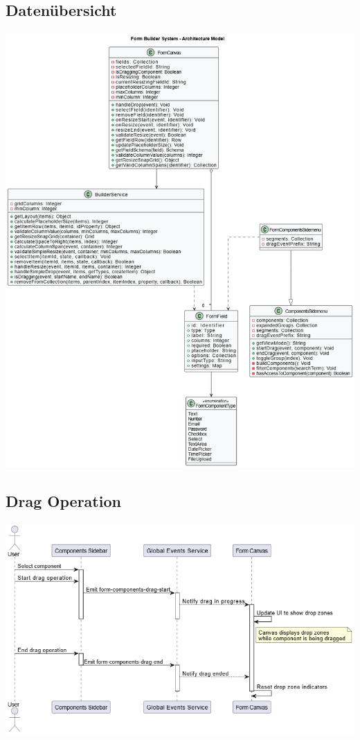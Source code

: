 \documentclass[a4paper,11pt]{article}
\begin{document}
\subsection{ Datenübersicht}
\includegraphics[width=1.1\textwidth]{UML Class digram.drawio}


\newpage
\subsection{ Drag Operation}
\includegraphics[width=1.1\textwidth]{drag.drawio}
\newpage
\end{document}

